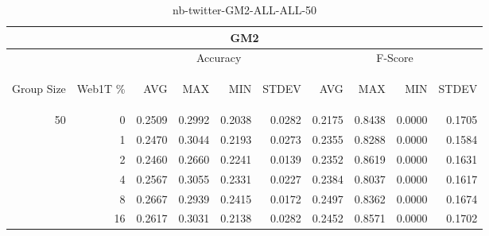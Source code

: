 \begin{center}
\begin{table}[htbp]
\begin{center}
\begin{tabular}{ | r | r | r | r | r | r | r | r | r | r |}
\hline
\multicolumn{10}{|c|}{GM2}\\
\hline
 & & \multicolumn{4}{|c|}{Accuracy} & \multicolumn{4}{|c|}{F-Score}\\ \cline{3-10}
\begin{sideways}Group Size\end{sideways} & \begin{sideways}Web1T \%\end{sideways} & \begin{sideways}AVG\end{sideways} & \begin{sideways}MAX\end{sideways} & \begin{sideways}MIN\end{sideways} & \begin{sideways}STDEV\end{sideways} & \begin{sideways}AVG\end{sideways} & \begin{sideways}MAX\end{sideways} & \begin{sideways}MIN\end{sideways} & \begin{sideways}STDEV\end{sideways}\\
\hline
\multirow{5}{*}{50}
 & 0 & 0.2509 & 0.2992 & 0.2038 & 0.0282 & 0.2175 & 0.8438 & 0.0000 & 0.1705\\ \cline{2-10}
 & 1 & 0.2470 & 0.3044 & 0.2193 & 0.0273 & 0.2355 & 0.8288 & 0.0000 & 0.1584\\ \cline{2-10}
 & 2 & 0.2460 & 0.2660 & 0.2241 & 0.0139 & 0.2352 & 0.8619 & 0.0000 & 0.1631\\ \cline{2-10}
 & 4 & 0.2567 & 0.3055 & 0.2331 & 0.0227 & 0.2384 & 0.8037 & 0.0000 & 0.1617\\ \cline{2-10}
 & 8 & 0.2667 & 0.2939 & 0.2415 & 0.0172 & 0.2497 & 0.8362 & 0.0000 & 0.1674\\ \cline{2-10}
 & 16 & 0.2617 & 0.3031 & 0.2138 & 0.0282 & 0.2452 & 0.8571 & 0.0000 & 0.1702\\ \cline{2-10}
\hline
\end{tabular}
\caption{nb-twitter-GM2-ALL-ALL-50}
\label{table:nb-twitter-GM2-ALL-ALL-50}
\end{center}
\end{table}
\end{center}

